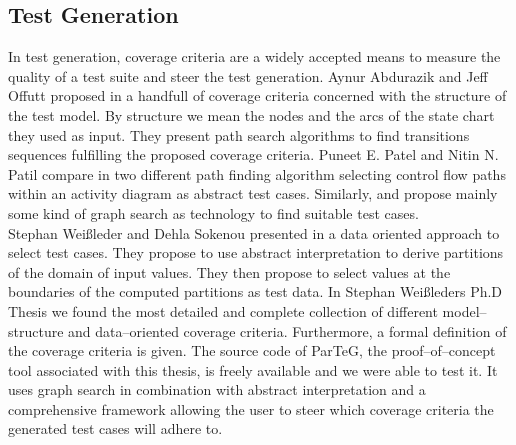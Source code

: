 \subsection{Test Generation}
In test generation, coverage criteria are a widely accepted means to measure the quality of a test suite and steer the test generation. Aynur Abdurazik and Jeff Offutt proposed in \cite{Offutt:1999:GeneratingTestsFromUmlSpec} a handfull of coverage criteria concerned with the structure of the test model. By structure we mean the nodes and the arcs of the state chart they used as input. They present path search algorithms to find transitions sequences fulfilling the proposed coverage criteria.
Puneet E. Patel and Nitin N. Patil compare in \cite{Patel12TestCaseFormationUsigUMLActivityDiagram} two different path finding algorithm selecting control flow paths within an activity diagram as abstract test cases. Similarly, \cite{kundu2009novel} and \cite{Linzhang04GeneratingTestCasefromActivityGrayBoxMethod} propose mainly some kind of graph search as technology to find suitable test cases.\\
Stephan Wei{\ss}leder and Dehla Sokenou presented in \cite{weissleder2008automatic} a data oriented approach to select test cases. They propose to use abstract interpretation to derive partitions of the domain of input values. They then propose to select values at the boundaries of the computed partitions as test data.
In Stephan Wei{\ss}leders Ph.D Thesis \cite{ParTeG} we found the most detailed and complete collection of different model--structure and data--oriented coverage criteria. Furthermore, a formal definition of the coverage criteria is given. The source code of ParTeG, the proof--of--concept tool associated with this thesis, is freely available and we were able to test it. It uses graph search in combination with abstract interpretation and a comprehensive framework allowing the user to steer which coverage criteria the generated test cases will adhere to.\\
